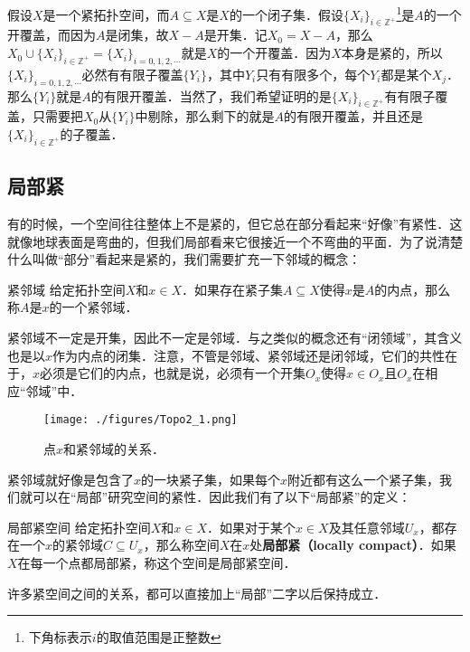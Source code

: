 假设$X$是一个紧拓扑空间，而$A\subseteq X$是$X$的一个闭子集．假设$\{X_i\}_{i\in \mathbb{Z}^+}$\footnote{下角标表示$i$的取值范围是正整数}是$A$的一个开覆盖，而因为$A$是闭集，故$X-A$是开集．记$X_0=X-A$，那么$X_0\cup\{X_i\}_{i\in \mathbb{Z}^+}=\{X_i\}_{i=0, 1, 2, \cdots}$就是$X$的一个开覆盖．因为$X$本身是紧的，所以$\{X_i\}_{i=0, 1, 2, \cdots}$必然有有限子覆盖$\{Y_i\}$，其中$Y_i$只有有限多个，每个$Y_i$都是某个$X_j$．那么$\{Y_i\}$就是$A$的有限开覆盖．当然了，我们希望证明的是$\{X_i\}_{i\in \mathbb{Z}^+}$有有限子覆盖，只需要把$X_0$从$\{Y_i\}$中剔除，那么剩下的就是$A$的有限开覆盖，并且还是$\{X_i\}_{i\in \mathbb{Z}^+}$的子覆盖．

\subsection{局部紧}

有的时候，一个空间往往整体上不是紧的，但它总在部分看起来“好像”有紧性．这就像地球表面是弯曲的，但我们局部看来它很接近一个不弯曲的平面．为了说清楚什么叫做“部分”看起来是紧的，我们需要扩充一下邻域的概念：

\begin{definition}{紧邻域}
给定拓扑空间$X$和$x\in X$．如果存在紧子集$A\subseteq X$使得$x$是$A$的内点，那么称$A$是$x$的一个紧邻域．
\end{definition}

紧邻域不一定是开集，因此不一定是邻域．与之类似的概念还有“闭领域”，其含义也是以$x$作为内点的闭集．注意，不管是邻域、紧邻域还是闭邻域，它们的共性在于，$x$必须是它们的内点，也就是说，必须有一个开集$O_x$使得$x\in O_x$且$O_x$在相应“邻域”中．

\begin{figure}[ht]
\centering
\texttt{[image: ./figures/Topo2\_1.png]}
\caption{点$x$和紧邻域的关系．} \label{Topo2_fig1}
\end{figure}

紧邻域就好像是包含了$x$的一块紧子集，如果每个$x$附近都有这么一个紧子集，我们就可以在“局部”研究空间的紧性．因此我们有了以下“局部紧”的定义：

\begin{definition}{局部紧空间}
给定拓扑空间$X$和$x\in X$．如果对于某个$x\in X$及其任意邻域$U_x$，都存在一个$x$的紧邻域$C\subseteq U_x$，那么称空间$X$在$x$处\textbf{局部紧（locally compact）}．如果$X$在每一个点都局部紧，称这个空间是局部紧空间．
\end{definition}

许多紧空间之间的关系，都可以直接加上“局部”二字以后保持成立．